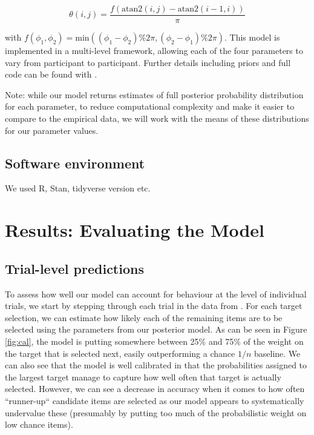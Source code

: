 \documentclass[vision,article,submit,pdftex,moreauthors]{Definitions/mdpi}
\begin{document}
\begin{linenomath}
\begin{equation}
    \theta(i,j) = \frac{f(\text{atan2}(i, j) - \text{atan2}(i-1, i))}{\pi}
\end{equation}
\end{linenomath}

with $f(\phi_1, \phi_2) = \text{min}((\phi_1 - \phi_2) \% 2\pi, (\phi_2 - \phi_1) \% 2\pi)$. This model is implemented in a multi-level framework, allowing each of the four parameters to vary from participant to participant. Further details including priors and full code can be found with \cite{clarke2022foraging}.

Note: while our model returns estimates of full posterior probability distribution for each parameter, to reduce computational complexity and make it easier to compare to the empirical data, we will work with the means of these distributions for our parameter values. 

\subsection{Software environment}
 
 We used R, Stan, tidyverse version etc. 

\section{Results: Evaluating the Model}

\subsection{Trial-level predictions}

To assess how well our model can account for behaviour at the level of individual trials, we start by stepping through each trial in the data from \cite{clarke2022}. For each target selection, we can estimate how likely each of the remaining items are to be selected using the parameters from our posterior model. As can be seen in Figure \ref{fig:cal}, the model is putting somewhere between 25\% and 75\% of the weight on the target that is selected next, easily outperforming a chance $1/n$ baseline. We can also see  that the model is well calibrated in that the probabilities assigned to the largest target manage to capture how well often that target is actually selected. However, we can see a decrease in accuracy when it comes to how often ``runner-up`` candidate items are selected as our model appears to systematically undervalue these (presumably by putting too much of the probabilistic weight on low chance items).
\end{document}
